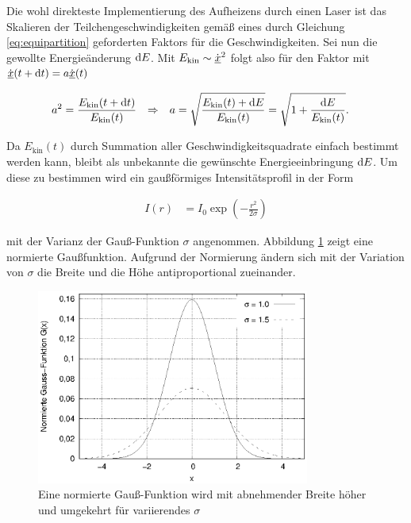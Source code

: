 		Die wohl direkteste Implementierung des Aufheizens durch einen Laser ist das Skalieren
		der Teilchengeschwindigkeiten gemäß eines durch Gleichung \eqref{eq:equipartition}
		geforderten Faktors für die Geschwindigkeiten. Sei nun die gewollte Energieänderung
		$\dx[E]$. Mit $E_\text{kin} \sim \dot{\uvec{x}}^2$ folgt also für den Faktor mit
		$\dot{\uvec{x}}(t + \dt) = a\dot{\uvec{x}}(t)$

		\begin{align}
			a^2 &= \frac{E_\text{kin}(t + \dt)}{E_\text{kin}(t)}
			&\Rightarrow&&
			a &= \sqrt{\frac{E_\text{kin}(t) + \dx[E]}{E_\text{kin}(t)}}
				= \sqrt{1 + \frac{\dx[E]}{E_\text{kin}(t)}}
			.
			\label{eq:factor}
		\end{align}

		Da $E_\text{kin}(t)$ durch Summation aller Geschwindigkeitsquadrate einfach bestimmt
		werden kann, bleibt als unbekannte die gewünschte Energieeinbringung $\dx[E]$. Um diese
		zu bestimmen wird ein gaußförmiges Intensitätsprofil in der Form

		\begin{align}
			I(r) &= I_0 \exp\left(-\frac{r^2}{2\sigma}\right) \label{eq:gauss_profile}
		\end{align}

		mit der Varianz der Gauß-Funktion $\sigma$ angenommen. Abbildung \ref{fig:gauss} zeigt
		eine normierte Gaußfunktion. Aufgrund der Normierung ändern sich mit der Variation von
		$\sigma$ die Breite und die Höhe antiproportional zueinander.

		\begin{figure}[!ht]
			\centering
			\includegraphics[width=0.8\textwidth]{chapter/main/theory/plt/gauss.eps}
			\caption{Eine normierte Gauß-Funktion wird mit abnehmender Breite höher und
			umgekehrt für variierendes $\sigma$}
			\label{fig:gauss}
		\end{figure}

